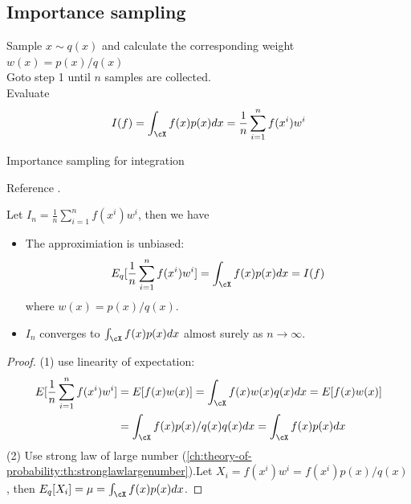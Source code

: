 \begin{refsection}
\subsection{Importance sampling}
\label{ch:MonteCarlo-methods--optimization:sec:importanceSampling}
\begin{algorithm}[H]
	\SetAlgoLined
	Sample $x\sim q(x)$ and calculate the corresponding weight $w(x) = p(x)/q(x)$\\
	Goto step 1 until $n$ samples are collected.\\
	Evaluate 
	$$I(f) = \int_{\cX} f(x) p(x)dx = \frac{1}{n}\sum_{i=1}^n f(x^i)w^i $$
	
	\caption{Importance sampling for integration }
\end{algorithm}

\begin{remark}
	Reference \cite{andrieu2003introduction}.
\end{remark}

\begin{lemma}
	Let $I_n = \frac{1}{n}\sum_{i=1}^n f(x^i)w^i$, then we have
	\begin{itemize}
		\item The approximiation is unbiased: $$E_q[\frac{1}{n}\sum_{i=1}^n f(x^i)w^i] = \int_{\cX} f(x) p(x)dx = I(f) $$
		where $w(x) = p(x)/q(x)$.
		\item $I_n$ converges to $\int_{\cX} f(x) p(x)dx$ almost surely as $n\to \infty$.
	\end{itemize}
	
\end{lemma}
\begin{proof}
	(1) use linearity of expectation:
	\begin{align*}
	E[\frac{1}{n}\sum_{i=1}^n f(x^i)w^i] &= E[f(x)w(x)] = \int_{\cX} f(x)w(x)q(x)dx = E[f(x)w(x)]\\
	& = \int_{\cX} f(x)p(x)/q(x)q(x)dx = \int_{\cX} f(x)p(x)dx
	\end{align*}
	(2) Use strong law of large number (\autoref{ch:theory-of-probability:th:stronglawlargenumber}).Let $X_i = f(x^i)w^i = f(x^i)p(x)/q(x)$, then $E_q[X_i] = \mu = \int_{\cX} f(x)p(x)dx$. 
\end{proof}


\end{refsection}
